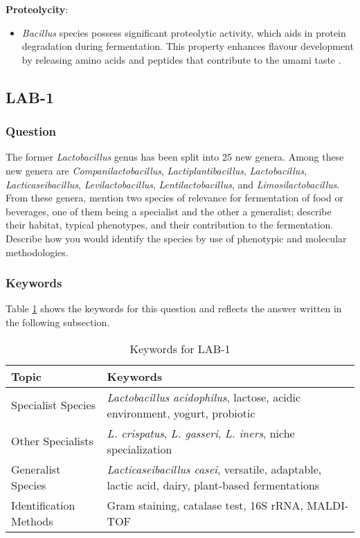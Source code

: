 \textbf{Proteolycity}: 
\begin{itemize}
    \item \textit{Bacillus} species possess significant proteolytic activity, which aids in protein degradation during fermentation. This property enhances flavour development by releasing amino acids and peptides that contribute to the umami taste \cite*{L8-ImpQuorum}.
\end{itemize}

\subsection{LAB-1}
\subsubsection*{Question}
The former \textit{Lactobacillus} genus has been split into 25 new genera. Among these new genera are \textit{Companilactobacillus}, \textit{Lactiplantibacillus}, \textit{Lactobacillus}, \textit{Lacticaseibacillus}, \textit{Levilactobacillus}, \textit{Lentilactobacillus}, and \textit{Limosilactobacillus}. From these genera, mention two species of relevance for fermentation of food or beverages, one of them being a specialist and the other a generalist; describe their habitat, typical phenotypes, and their contribution to the fermentation. Describe how you would identify the species by use of phenotypic and molecular methodologies.

\subsubsection*{Keywords}
Table \ref{tab:KW-LAB1} shows the keywords for this question and reflects the answer written in the following subsection.
\begin{table}[h]
    \centering
    \caption{Keywords for LAB-1} 
    \label{tab:KW-LAB1}
    \begin{tabularx}{\textwidth}{l|X}
        \textbf{Topic} & \textbf{Keywords} \\
        \hline
        Specialist Species & \textit{Lactobacillus acidophilus}, lactose, acidic environment, yogurt, probiotic \\
        Other Specialists & \textit{L. crispatus}, \textit{L. gasseri}, \textit{L. iners}, niche specialization \\
        Generalist Species & \textit{Lacticaseibacillus casei}, versatile, adaptable, lactic acid, dairy, plant-based fermentations \\
        Identification Methods & Gram staining, catalase test, 16S rRNA, MALDI-TOF \\
    \end{tabularx}
\end{table} 

